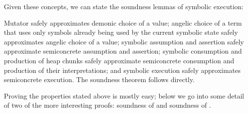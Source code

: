 \documentclass{CSML}
\newcommand{\sh}{\hat{h}}
\newcommand{\sv}{\hat{v}}
\newcommand{\display}[1]{}
\theoremstyle{definition}\newtheorem{notation}[thm]{Notation}
\theoremstyle{plain}\newtheorem{satz}[thm]{Satz}
\begin{document}
Given these concepts, we can state the soundness lemmas of symbolic 
execution:
\begin{lem}[Soundness]
\display{\begin{array}{r @{\ } c @{\ } l}
C({-}) \rightsquigarrow_I C'({-}) \Rightarrow \sv \leftarrow \mathsf{fresh}; C(\sv) & \rightsquigarrow_I & \bigotimes v.\;C'(v)\\
C({-}) \rightsquigarrow_I C'({-}) \Rightarrow \bigoplus \sv.\;C(\sv) & \rightsquigarrow_I & \bigoplus v.\;C'(v)\\
\mathsf{sassume}(b), \mathsf{sassert}(b) & \rightsquigarrow_I & \mathsf{assume}(b), \mathsf{assert}(b)\\
\llbracket \sh \rrbracket_I = h \Rightarrow \mathsf{sconsume}(\sh), \mathsf{sproduce}(\sh) & \rightsquigarrow_I & \mathsf{consume}(h), \mathsf{produce}(h)\\
\mathsf{sconsume}(a), \mathsf{sproduce}(a) & \rightsquigarrow_I & \mathsf{consume}(a), \mathsf{produce}(a)\\
\mathsf{symexec}(c) & \rightsquigarrow_I & \mathsf{scexec}(c)\\
\mathsf{svalid}(r) & \Rightarrow & \mathsf{valid}(r)\\
\mathsf{sym}\textsf{-}\mathsf{safe\_program}(c) & \Rightarrow & \mathsf{sc}\textsf{-}\mathsf{safe\_program}(c)
\end{array}}
\end{lem}\medskip

\noindent Mutator  safely approximates demonic choice of 
a value; angelic choice of a term that uses only symbols already being 
used by the current symbolic state safely approximates angelic choice of a 
value; symbolic assumption and assertion safely approximate semiconcrete 
assumption and assertion; symbolic consumption and production of heap 
chunks safely approximate semiconcrete consumption and production of their 
interpretations; and symbolic execution safely approximates semiconcrete 
execution. The soundness theorem follows directly. 

Proving the properties stated above is mostly easy; below we go into some 
detail of two of the more interesting proofs: soundness of 
 and soundness of . 
\end{document}
